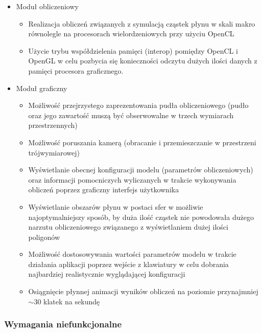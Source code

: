 \documentclass[polish, 12pt]{aghthesis}
\begin{document}
		\begin{itemize}
		
			\item Moduł obliczeniowy
			
			\begin{itemize}
			
				\item Realizacja obliczeń związanych z symulacją cząstek płynu w skali makro równolegle na procesorach wielordzeniowych przy użyciu OpenCL
				\item Użycie trybu współdzielenia pamięci (interop) pomiędzy OpenCL i OpenGL w celu pozbycia się konieczności odczytu dużych ilości danych z pamięci procesora graficznego.
			
			\end{itemize}						
			
			\item Moduł graficzny
			
			\begin{itemize}
			
				\item Możliwość przejrzystego zaprezentowania pudła obliczeniowego (pudło oraz jego zawartość muszą być obserwowalne w trzech wymiarach przestrzennych)
				\item Możliwość poruszania kamerą (obracanie i przemieszczanie w przestrzeni trójwymiarowej)
				\item Wyświetlanie obecnej konfiguracji modelu (parametrów obliczeniowych) oraz informacji pomocniczych wyliczanych w trakcie wykonywania obliczeń poprzez graficzny interfejs użytkownika
				\item Wyświetlanie obszarów płynu w postaci sfer w możliwie najoptymalniejszy sposób, by duża ilość cząstek nie powodowała dużego narzutu obliczeniowego związanego z wyświetlaniem dużej ilości poligonów
				\item Możliwość dostosowywania wartości parametrów modelu w trakcie działania aplikacji poprzez wejście z klawiatury w celu dobrania najbardziej realistycznie wyglądającej konfiguracji
				\item Osiągnięcie płynnej animacji wyników obliczeń na poziomie przynajmniej $\sim30$ klatek na sekundę
			
			\end{itemize}	
		
		\end{itemize}
		
		\subsubsection{Wymagania niefunkcjonalne}
		
\end{document}
